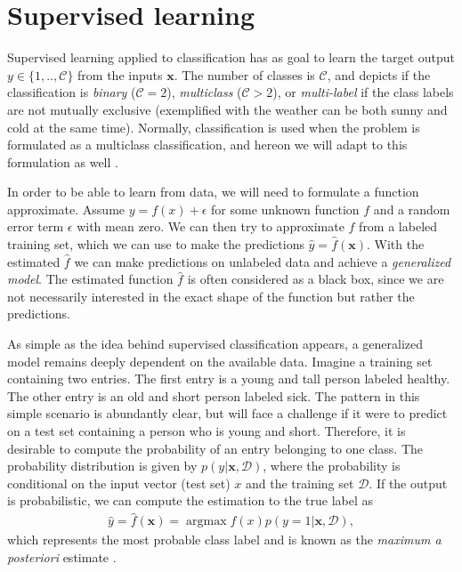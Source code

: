 
\section{Supervised learning}

Supervised learning applied to classification has as goal to learn the target output $y \in \{1,..,\mathcal{C}\}$ from the inputs $\boldsymbol{x}$. The number of classes is $\mathcal{C}$, and depicts if the classification is \textit{binary} ($\mathcal{C}=2$), \textit{multiclass} ($\mathcal{C}>2$), or \textit{multi-label} if the class labels are not mutually exclusive (exemplified with the weather can be both sunny and cold at the same time). Normally, classification is used when the problem is formulated as a multiclass classification, and hereon we will adapt to this formulation as well \cite{Murphy2012}.

In order to be able to learn from data, we will need to formulate a function approximate. Assume $y = f(x) + \epsilon$ for some unknown function $f$ and a random error term $\epsilon$ with mean zero. We can then try to approximate $f$ from a labeled training set, which we can use to make the predictions $\hat{y}=\hat{f}(\boldsymbol{x})$. With the estimated $\hat{f}$ we can make predictions on unlabeled data and achieve a \textit{generalized model}. The estimated function $\hat{f}$ is often considered as a black box, since we are not necessarily interested in the exact shape of the function but rather the predictions.

As simple as the idea behind supervised classification appears, a generalized model remains deeply dependent on the available data. Imagine a training set containing two entries. The first entry is a young and tall person labeled healthy. The other entry is an old and short person labeled sick. The pattern in this simple scenario is abundantly clear, but will face a challenge if it were to predict on a test set containing a person who is young and short. Therefore, it is desirable to compute the probability of an entry belonging to one class. The probability distribution is given by $p(y|\boldsymbol{x}, \mathcal{D})$, where the probability is conditional on the input vector (test set) $x$ and the training set $\mathcal{D}$. If the output is probabilistic, we can compute the estimation to the true label as
\begin{align}
  \hat{y} = \hat{f}(\boldsymbol{x}) = \operatorname*{argmax} f(x) p(y = 1|\boldsymbol{x}, \mathcal{D}),
\end{align}
which represents the most probable class label and is known as the \textit{maximum a posteriori} estimate \cite{Murphy2012}.


